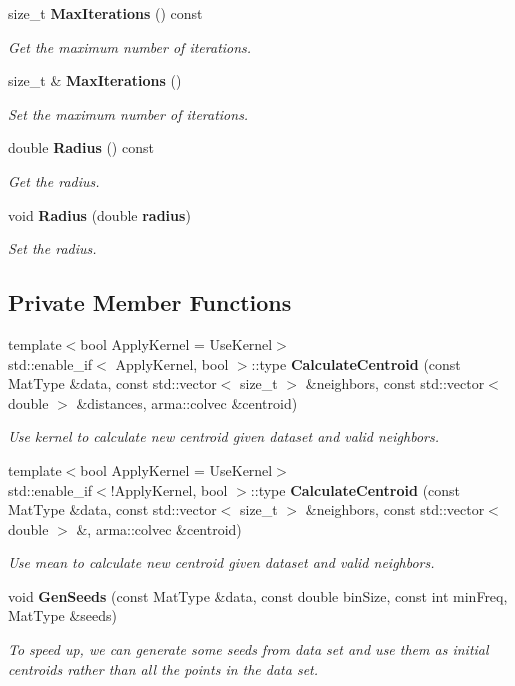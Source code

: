 \begin{DoxyCompactItemize}
size\+\_\+t {\bf Max\+Iterations} () const 
\begin{DoxyCompactList}\small\item\em Get the maximum number of iterations. \end{DoxyCompactList}\item 
size\+\_\+t \& {\bf Max\+Iterations} ()
\begin{DoxyCompactList}\small\item\em Set the maximum number of iterations. \end{DoxyCompactList}\item 
double {\bf Radius} () const 
\begin{DoxyCompactList}\small\item\em Get the radius. \end{DoxyCompactList}\item 
void {\bf Radius} (double {\bf radius})
\begin{DoxyCompactList}\small\item\em Set the radius. \end{DoxyCompactList}\end{DoxyCompactItemize}
\subsection*{Private Member Functions}
\begin{DoxyCompactItemize}
\item 
{\footnotesize template$<$bool Apply\+Kernel = Use\+Kernel$>$ }\\std\+::enable\+\_\+if$<$ Apply\+Kernel, bool $>$\+::type {\bf Calculate\+Centroid} (const Mat\+Type \&data, const std\+::vector$<$ size\+\_\+t $>$ \&neighbors, const std\+::vector$<$ double $>$ \&distances, arma\+::colvec \&centroid)
\begin{DoxyCompactList}\small\item\em Use kernel to calculate new centroid given dataset and valid neighbors. \end{DoxyCompactList}\item 
{\footnotesize template$<$bool Apply\+Kernel = Use\+Kernel$>$ }\\std\+::enable\+\_\+if$<$!Apply\+Kernel, bool $>$\+::type {\bf Calculate\+Centroid} (const Mat\+Type \&data, const std\+::vector$<$ size\+\_\+t $>$ \&neighbors, const std\+::vector$<$ double $>$ \&, arma\+::colvec \&centroid)
\begin{DoxyCompactList}\small\item\em Use mean to calculate new centroid given dataset and valid neighbors. \end{DoxyCompactList}\item 
void {\bf Gen\+Seeds} (const Mat\+Type \&data, const double bin\+Size, const int min\+Freq, Mat\+Type \&seeds)
\begin{DoxyCompactList}\small\item\em To speed up, we can generate some seeds from data set and use them as initial centroids rather than all the points in the data set. \end{DoxyCompactList}\end{DoxyCompactItemize}
